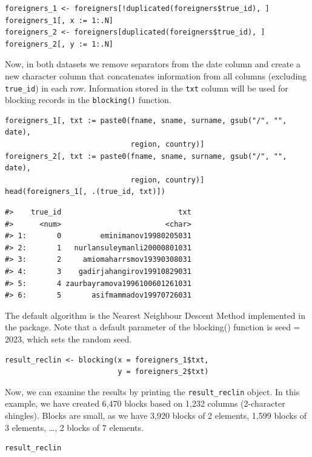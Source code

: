 \begin{verbatim}
foreigners_1 <- foreigners[!duplicated(foreigners$true_id), ]
foreigners_1[, x := 1:.N]
foreigners_2 <- foreigners[duplicated(foreigners$true_id), ]
foreigners_2[, y := 1:.N]
\end{verbatim}

Now, in both datasets we remove separators from the date column and
create a new character column that concatenates information from all
columns (excluding \texttt{true\_id}) in each row. Information stored in the
\texttt{txt} column will be used for blocking records in the \texttt{blocking()}
function.

\begin{verbatim}
foreigners_1[, txt := paste0(fname, sname, surname, gsub("/", "", date), 
                             region, country)]
foreigners_2[, txt := paste0(fname, sname, surname, gsub("/", "", date), 
                             region, country)]
head(foreigners_1[, .(true_id, txt)])
\end{verbatim}

\begin{verbatim}
#>    true_id                           txt
#>      <num>                        <char>
#> 1:       0         eminimanov19980205031
#> 2:       1   nurlansuleymanli20000801031
#> 3:       2     amiomaharrsmov19390308031
#> 4:       3    gadirjahangirov19910829031
#> 5:       4 zaurbayramova1996100601261031
#> 6:       5       asifmammadov19970726031
\end{verbatim}

The default algorithm is the Nearest Neighbour Descent Method
\citep{Dong2011} implemented in the  package. Note that a
default parameter of the blocking() function is seed = 2023, which sets
the random seed.

\begin{verbatim}
result_reclin <- blocking(x = foreigners_1$txt,
                          y = foreigners_2$txt)
\end{verbatim}

Now, we can examine the results by printing the \texttt{result\_reclin} object.
In this example, we have created
6,470
blocks based on 1,232
columns (2-character shingles). Blocks are small, as we have
3,920 blocks of 2
elements, 1,599 blocks of
3 elements, \ldots,
2 blocks of
7 elements.

\begin{verbatim}
result_reclin
\end{verbatim}

